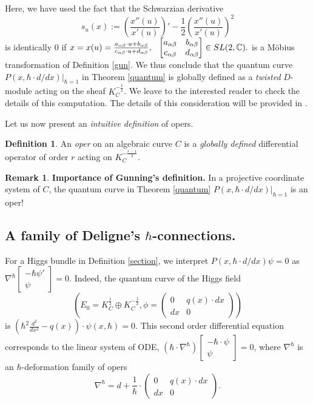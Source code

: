 \documentclass[oneside, 11pt]{amsart}
\theoremstyle{definition}
\newtheorem{Def}[thm]{Definition}
\newtheorem{rem}[thm]{Remark}
\numberwithin{equation}{subsection}
\def\a{\alpha}
\def\b{\beta}
\newcommand{\be}{\begin{equation}}
\newcommand{\ee}{\end{equation}}
\newcommand{\bC}{{\mathbb{C}}}
\newcommand{\half}{{\frac{1}{2}}}
\begin{document}
Here, we have used the fact that the 
Schwarzian derivative 
$$
s_u(x):=\left(\frac{x''(u)}{x'(u)}\right)'-\frac{1}{2}\left(
\frac{x''(u)}{x'(u)}\right)^2
$$
is identically $0$ if $x=x(u)= \frac{a_{\a\b} \cdot u + b_{\a\b}}
{c_{\a\b}\cdot u + d_{\a\b}}, 
 \hskip .1in
\begin{bmatrix}
a_{\a\b}&b_{\a\b}\\
c_{\a\b}&d_{\a\b}
\end{bmatrix}
\in SL(2,\bC).
$ is a M\"obius 
transformation of Definition \eqref{gun}. 
We thus conclude that the quantum curve $P(x,\hbar \cdot d/dx)|_{\hbar=1}$ in Theorem \ref{quantum} is globally defined as a \emph{twisted} $D$-module
acting on the sheaf $K_C^{-\half}$. We leave to the interested reader to check the details of this computation.
The details of this consideration will be provided in \cite{OD21,OD22}. 

Let us now present  an \textit{intuitive definition} of opers.

\begin{Def}\label{oper}
An \textit{oper} on an algebraic curve
$C$ is a \textit{globally defined} differential operator
of order $r$ acting on $K_C^{-\frac{r-1}{2}}$.
\end{Def}

\begin{rem}\textbf{Importance of Gunning's definition.} 
In a projective coordinate system of $C$, the quantum curve in Theorem \ref{quantum} $P(x,\hbar \cdot d/dx)|_{\hbar=1}$ is an oper! 
\end{rem}

\subsection{A family of 
Deligne's $\hbar$-connections.}\label{Deligne}
For a Higgs bundle in Definition \ref{section},
we interpret
$P(x,\hbar \cdot d/dx)\psi=0$ as $\nabla^{\hbar}\begin{bmatrix}
-\hbar \psi'\\
\psi
\end{bmatrix}=0.$ Indeed, the quantum curve  of the Higgs field 
$$\left( E_0=K_C^{\frac{1}{2}} \oplus K_C^{-\frac{1}{2}}, \phi=\begin{pmatrix}
0&q(x)\cdot dx\\ dx & 0 
\end{pmatrix} 
\right)$$
 is $\left(\hbar^2 \frac{d^2}{dx^2}-q(x)\right)\cdot \psi(x,\hbar) = 0$. This second order differential equation corresponds to the linear system of ODE, $\left(\hbar\cdot \nabla^{\hbar}\right) \begin{bmatrix}
 -\hbar \cdot \psi\\
\psi
\end{bmatrix}=0$,
where $\nabla^{\hbar}$ is an $\hbar$-deformation 
family of opers
\be \label{oper}
\nabla^{\hbar}=d+\frac{1}{\hbar} \cdot \begin{pmatrix}
0&q(x)\cdot dx\\ dx& 0
\end{pmatrix}.
\ee
\end{document}

